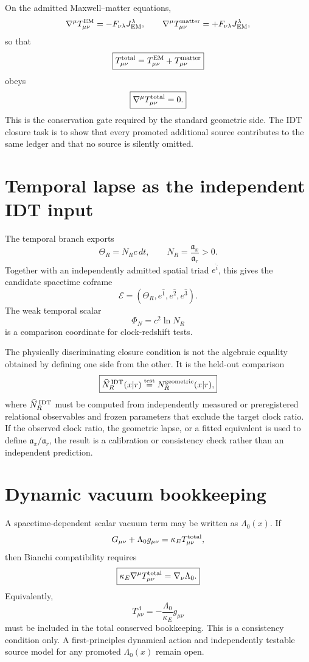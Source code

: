 \documentclass[11pt]{book}
\begin{document}
On the admitted Maxwell--matter equations,
\[
\nabla^\mu T^{\rm EM}_{\mu\nu}
=-F_{\nu\lambda}J_{\rm EM}^{\lambda},
\qquad
\nabla^\mu T^{\rm matter}_{\mu\nu}
=+F_{\nu\lambda}J_{\rm EM}^{\lambda},
\]
so that
\[
\boxed{
T^{\rm total}_{\mu\nu}
=T^{\rm EM}_{\mu\nu}+T^{\rm matter}_{\mu\nu}
}
\]
obeys
\[
\boxed{\nabla^\mu T^{\rm total}_{\mu\nu}=0.}
\]
This is the conservation gate required by the standard geometric side. The IDT closure task is to show that every promoted additional source contributes to the same ledger and that no source is silently omitted.

\section{Temporal lapse as the independent IDT input}

The temporal branch exports
\[
\Theta_R=N_Rc\,dt,
\qquad
N_R=\frac{\mathfrak a_x}{\mathfrak a_r}>0.
\]
Together with an independently admitted spatial triad \(e^{\hat i}\), this gives the candidate spacetime coframe
\[
\mathcal E=(\Theta_R,e^{\hat1},e^{\hat2},e^{\hat3}).
\]
The weak temporal scalar
\[
\Phi_N=c^2\ln N_R
\]
is a comparison coordinate for clock-redshift tests.

The physically discriminating closure condition is not the algebraic equality obtained by defining one side from the other. It is the held-out comparison
\[
\boxed{
\widehat N_R^{\,\rm IDT}(x|r)
\stackrel{\rm test}{=}
N_R^{\rm geometric}(x|r),
}
\]
where \(\widehat N_R^{\,\rm IDT}\) must be computed from independently measured or preregistered relational observables and frozen parameters that exclude the target clock ratio. If the observed clock ratio, the geometric lapse, or a fitted equivalent is used to define \(\mathfrak a_x/\mathfrak a_r\), the result is a calibration or consistency check rather than an independent prediction.

\section{Dynamic vacuum bookkeeping}

A spacetime-dependent scalar vacuum term may be written as \(\Lambda_0(x)\). If
\[
G_{\mu\nu}+\Lambda_0g_{\mu\nu}
=
\kappa_E T^{\rm total}_{\mu\nu},
\]
then Bianchi compatibility requires
\[
\boxed{
\kappa_E\nabla^\mu T^{\rm total}_{\mu\nu}
=
\nabla_\nu\Lambda_0.
}
\]
Equivalently,
\[
T^\Lambda_{\mu\nu}
=-\frac{\Lambda_0}{\kappa_E}g_{\mu\nu}
\]
must be included in the total conserved bookkeeping. This is a consistency condition only. A first-principles dynamical action and independently testable source model for any promoted \(\Lambda_0(x)\) remain open.
\end{document}

